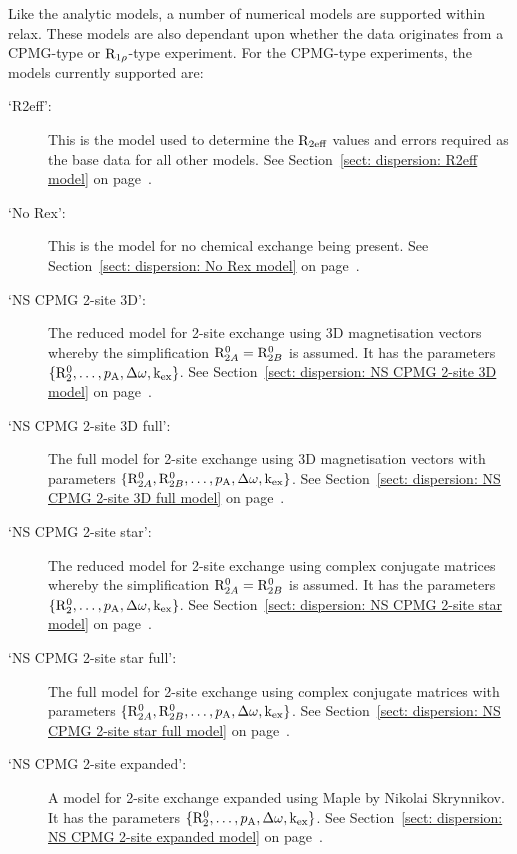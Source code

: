 Like the analytic models, a number of numerical models are supported within relax.
These models are also dependant upon whether the data originates from a CPMG-type or $\mathrm{R}_{1\rho}$-type experiment.
For the CPMG-type experiments, the models currently supported are:

\begin{description}
\item[`R2eff':]  This is the model used to determine the $\mathrm{R}_{2\textrm{eff}}$ values and errors required as the base data for all other models.  See Section~\ref{sect: dispersion: R2eff model} on page~\pageref{sect: dispersion: R2eff model}.
\item[`No Rex':]  This is the model for no chemical exchange being present.  See Section~\ref{sect: dispersion: No Rex model} on page~\pageref{sect: dispersion: No Rex model}.
\item[`NS CPMG 2-site 3D':]  The reduced model for 2-site exchange using 3D magnetisation vectors whereby the simplification $\mathrm{R}_{2A}^0 = \mathrm{R}_{2B}^0$ is assumed.  It has the parameters $\{\mathrm{R}_2^0, \dots, p_\textrm{A}, \Delta\omega, \textrm{k}_\textrm{ex}\}$.  See Section~\ref{sect: dispersion: NS CPMG 2-site 3D model} on page~\pageref{sect: dispersion: NS CPMG 2-site 3D model}.
\item[`NS CPMG 2-site 3D full':]  The full model for 2-site exchange using 3D magnetisation vectors with parameters $\{\mathrm{R}_{2A}^0, \mathrm{R}_{2B}^0, \dots, p_\textrm{A}, \Delta\omega, \textrm{k}_\textrm{ex}\}$.  See Section~\ref{sect: dispersion: NS CPMG 2-site 3D full model} on page~\pageref{sect: dispersion: NS CPMG 2-site 3D full model}.
\item[`NS CPMG 2-site star':]  The reduced model for 2-site exchange using complex conjugate matrices whereby the simplification $\mathrm{R}_{2A}^0 = \mathrm{R}_{2B}^0$ is assumed.  It has the parameters $\{\mathrm{R}_2^0, \dots, p_\textrm{A}, \Delta\omega, \textrm{k}_\textrm{ex}\}$.  See Section~\ref{sect: dispersion: NS CPMG 2-site star model} on page~\pageref{sect: dispersion: NS CPMG 2-site star model}.
\item[`NS CPMG 2-site star full':]  The full model for 2-site exchange using complex conjugate matrices with parameters $\{\mathrm{R}_{2A}^0, \mathrm{R}_{2B}^0, \dots, p_\textrm{A}, \Delta\omega, \textrm{k}_\textrm{ex}\}$.  See Section~\ref{sect: dispersion: NS CPMG 2-site star full model} on page~\pageref{sect: dispersion: NS CPMG 2-site star full model}.
\item[`NS CPMG 2-site expanded':]  A model for 2-site exchange expanded using Maple by Nikolai Skrynnikov.  It has the parameters $\{\mathrm{R}_2^0, \dots, p_\textrm{A}, \Delta\omega, \textrm{k}_\textrm{ex}\}$.  See Section~\ref{sect: dispersion: NS CPMG 2-site expanded model} on page~\pageref{sect: dispersion: NS CPMG 2-site expanded model}.
\end{description}


